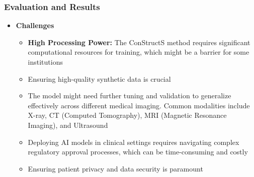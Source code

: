 \documentclass[aspectratio=169, lecture, amberg]{OTHAWbeamer}
\begin{document}
\begin{frame}
    \frametitle{Evaluation and Results}
    \begin{itemize}
        \item \textbf{Challenges}
        \vspace{0.2cm}
        \begin{itemize}
            \item <1-> \textbf{High Processing Power:} The ConStructS method requires significant computational resources for training, which might be a barrier for some institutions
            \vspace{0.2cm}
            \item <2-> Ensuring high-quality synthetic data is crucial
            \vspace{0.2cm}
            \item <3-> The model might need further tuning and validation to generalize effectively across different medical imaging. Common modalities include X-ray, CT (Computed Tomography), MRI (Magnetic Resonance Imaging), and Ultrasound
            \vspace{0.2cm}
            \item <4-> Deploying AI models in clinical settings requires navigating complex regulatory approval processes, which can be time-consuming and costly
            \vspace{0.2cm}
            \item <5-> Ensuring patient privacy and data security is paramount
        \end{itemize}
    \end{itemize}
    
\end{frame}
\end{document}
